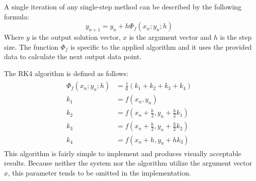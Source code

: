 \documentclass{article}
\begin{document}
	A single iteration of any single-step method can be described by the
	following formula:
	\begin{equation}
		y_{n + 1} = y_n + h\Phi_f(x_n; y_n; h)
	\end{equation}
	Where $y$ is the output solution vector, $x$ is the argument vector and
	$h$ is the step size. The function $\Phi_f$ is specific to the applied
	algorithm and it uses the provided data to calculate the next output
	data point.
	
	The RK4 algorithm is defined as follows:
	\begin{align}
		\begin{split}
			\Phi_f(x_n; y_n; h) &= \frac{1}{6}(k_1 + k_2 + k_3 + k_4)\\
			k_1 &= f(x_n, y_n)\\
			k_2 &= f(x_n + \frac{h}{2}, y_n + \frac{h}{2}k_1)\\
			k_3 &= f(x_n + \frac{h}{2}, y_n + \frac{h}{2}k_2)\\
			k_4 &= f(x_n + h, y_n + hk_3)
		\end{split}
	\end{align}
	This algorithm is fairly simple to implement and produces visually
	acceptable results. Because neither the system nor the algorithm utilize
	the argument vector $x$, this parameter tends to be omitted in the
	implementation.
	
\end{document}
